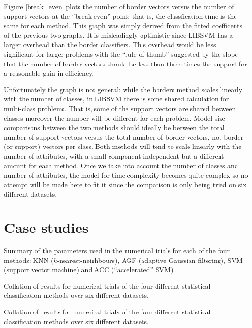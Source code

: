 \documentclass[11pt]{article}
\begin{document}
Figure \ref{break_even} plots the number of border vectors versus the number
of support vectors at the ``break even'' point: that is, the classfication
time is the same for each method.
This graph was simply derived from the fitted coefficents of the previous
two graphs.
It is misleadingly optimistic
since LIBSVM has a larger overhead than the border classifiers.
This overhead would be less significant for larger problems 
with the ``rule of thumb'' suggested by the slope 
that the number of border vectors should be less than three times the support
for a reasonable gain in efficiency.

Unfortunately the graph is not general: while the borders method scales linearly with
the number of classes, in LIBSVM there is some shared calculation for multi-class problems.
That is, some of the support vectors are shared between classes moreover the number will be different for each problem.
Model size comparisons between the two methods should ideally be between the total 
number of support vectors versus the total number of border vectors, not border (or support) vectors per class.
Both methods will tend to scale linearly with the number of attributes, with a small
component independent but a different amount for each method.
Once we take into account the number of classes and number of attributes, the
model for time complexity becomes quite complex so no attempt will be made here
to fit it since the comparison is only being tried on six different datasets.

\section{Case studies}

\begin{table}
		
	\label{param}
	\caption{Summary of the parameters used in the numerical trials for each of the four methods: KNN ($k$-nearest-neighbours), AGF (adaptive Gaussian filtering), SVM (support vector machine) and ACC (``accelerated'' SVM).}
\end{table}

\begin{table}
	{\small
		
	}
	\caption{Collation of results for numerical trials of the four different statistical classification methods over six different datasets.}
\end{table}

\begin{table}
	{\small
		
	}
	\caption{Collation of results for numerical trials of the four different statistical classification methods over six different datasets.}
\end{table}
\end{document}
